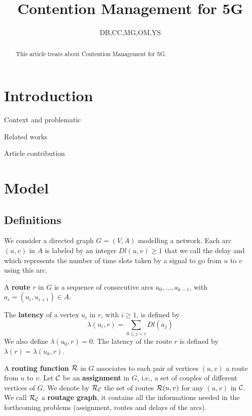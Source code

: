 \documentclass[a4paper,10pt]{article}
\title{Contention Management for 5G}
\author{DB,CC,MG,OM,YS}
\begin{document}
\maketitle

\begin{abstract}
This article treats about Contention Management for 5G.
\end{abstract}

\section{Introduction}
  \itemize
    \item Context and problematic
    \item Related works
    \item Article contribution

\section{Model}

  \subsection{Definitions}
  
	We consider a directed graph $G=(V,A)$ modelling a network. Each arc  $(u,v)$ in $A$ is labeled by an integer $Dl(u,v) \geq 1$ that we call the delay and
	which represents the number of time slots taken by a signal to go from $u$ to $v$ using this arc. 
	
      A {\bf route} $r$ in $G$ is a sequence of consecutive arcs $a_0, \ldots , a_{k-1}$, with $a_i=(u_i,u_{i+1}) \in A$. 
      
      The {\bf latency} of a vertex $u_i$ in $r$, with $i \geq 1$, is defined by $$\lambda(u_i,r)= \sum\limits_{0 \leq j <i} Dl(a_j)$$ We also define $\lambda(u_0,r)=0$.
      The latency of the route $r$ is defined by $\lambda (r)= \lambda (u_k,r)$.
      

      A {\bf routing function} $\cal R$ in $G$ associates to each pair of vertices $(u,v)$ a route from $u$ to $v$. Let $\cal C$ be an {\bf assignment} in $G$, i.e., a set of couples of different vertices of $G$. We denote by $\cal R_{\cal C}$ the set of routes ${\cal R}(u,v)$ for any $(u,v)$ in $\cal C$. We call $\cal R_{\cal C}$ a {\bf routage graph}, it contains all the informations needed in the forthcoming problems (assignment, routes and delays of the arcs). 
      
\end{document}

